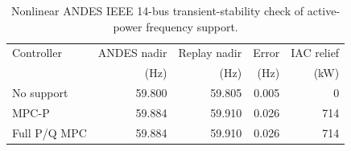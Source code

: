 \begin{table}[!t]
\centering
\footnotesize
\setlength{\tabcolsep}{3.5pt}
\caption{Nonlinear ANDES IEEE 14-bus transient-stability check of active-power frequency support.}
\label{tab:andes_validation}
\begin{tabular}{lrrrr}
\toprule
Controller & ANDES nadir & Replay nadir & Error & IAC relief \\
 & (Hz) & (Hz) & (Hz) & (kW) \\
\midrule
No support & 59.800 & 59.805 & 0.005 & 0 \\
MPC-P & 59.884 & 59.910 & 0.026 & 714 \\
Full P/Q MPC & 59.884 & 59.910 & 0.026 & 714 \\
\bottomrule
\end{tabular}
\end{table}
